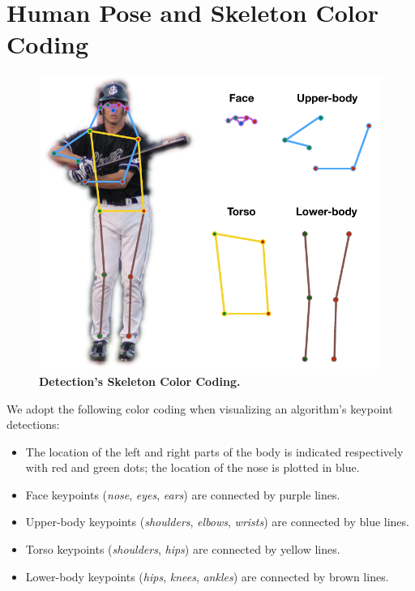\documentclass[10pt,onecolumn,letterpaper]{article}
\begin{document}
\section{Human Pose and Skeleton Color Coding}
\begin{figure}
\includegraphics[width=\linewidth]{./latex/color_coding.pdf}
\caption{ {\small \textbf{Detection's Skeleton Color Coding.}}}
\end{figure}
We adopt the following color coding when visualizing an algorithm's keypoint detections:
\begin{itemize}
    \item The location of the left and right parts of the body is indicated respectively with red and green dots; the location of the nose is plotted in blue.%
    \item Face keypoints (\textit{nose}, \textit{eyes}, \textit{ears}) are connected by purple lines.
    \item Upper-body keypoints (\textit{shoulders}, \textit{elbows}, \textit{wrists}) are connected by blue lines.
    \item Torso keypoints (\textit{shoulders}, \textit{hips}) are connected by yellow lines.
    \item Lower-body keypoints (\textit{hips}, \textit{knees}, \textit{ankles}) are connected by brown lines.
\end{itemize}
\clearpage
\end{document}
